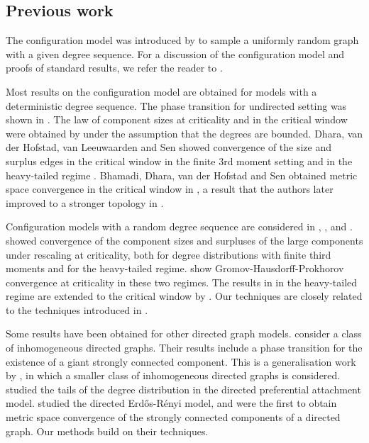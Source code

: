 \subsection{Previous work}
The configuration model was introduced by \citet{Bollobas1980} to sample a uniformly random graph with a given degree sequence. For a discussion of the configuration model and proofs of standard results, we refer the reader to \cite[Chapter 7]{hofstadRandomGraphsComplex2017}.

Most results on the configuration model are obtained for models with a deterministic degree sequence. The phase transition for undirected setting was shown in \cite{molloyCriticalPointRandom1995, Molloy1998, Janson2009}. The law of component sizes at criticality and in the critical window were obtained by \citet{Riordan2012} under the assumption that the degrees are bounded. Dhara, van der Hofstad, van Leeuwaarden and Sen showed convergence of the size and surplus edges in the critical window in the finite 3rd moment setting \cite{Dhara2017} and in the heavy-tailed regime \cite{Dhara2020}.  Bhamadi, Dhara, van der Hofstad and Sen obtained metric space convergence in the critical window in \cite{Bhamidi2020}, a result that the authors later improved to a stronger topology in \cite{Bhamidi2020Glmb}. 

Configuration models with a random degree sequence are considered in \cite{josephComponentSizesCritical2014}, \cite{conchon--kerjanStableGraphMetric2020}, and \cite{Donderwinkel2021heightprocess}. \citet{josephComponentSizesCritical2014} showed convergence of the component sizes and surpluses of the large components under rescaling at criticality, both for degree distributions with finite third moments and for the heavy-tailed regime. \citet{conchon--kerjanStableGraphMetric2020} show Gromov-Hausdorff-Prokhorov convergence at criticality in these two regimes. The results in \cite{conchon--kerjanStableGraphMetric2020} in the heavy-tailed regime are extended to the critical window by \citet{Donderwinkel2021heightprocess}. Our techniques are closely related to the techniques introduced in \cite{conchon--kerjanStableGraphMetric2020}. 

Some results have been obtained for other directed graph models. \citet{caoConnectivityGeneralClass2019} consider a class of inhomogeneous directed graphs. Their results include a phase transition for the existence of a giant strongly connected component. This is a generalisation work by \citet{Bloznelis2012}, in which a smaller class of inhomogeneous directed graphs is considered. \citet{Samorodnitsky2016} studied the tails of the degree distribution in the directed preferential attachment model. \citet{goldschmidtScalingLimitCritical2019} studied the directed Erd\H{o}s-R\'enyi model, and were the first to obtain metric space convergence of the strongly connected components of a directed graph. Our methods build on their techniques.

